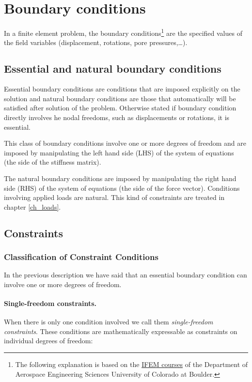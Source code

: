 \section{Boundary conditions}
In a finite element problem, the boundary conditions\footnote{The following explanation is based on the \href{http://www.colorado.edu/engineering/CAS/courses.d/IFEM.d/}{IFEM courses} of the Department of Aerospace Engineering Sciences
University of Colorado at Boulder.} are the specified values of the field variables (displacement, rotations, pore pressures,\ldots).

\subsection{Essential and natural boundary conditions}
Essential boundary conditions are conditions that are imposed explicitly on the solution and natural boundary conditions are those that automatically will be satisfied after solution of the problem. Otherwise stated if boundary condition directly involves he nodal freedoms, such as displacements or rotations, it is essential.

This class of boundary conditions involve one or more degrees of freedom and are imposed by manipulating the left hand side (LHS) of the system of equations (the side of the stiffness matrix).

The natural boundary conditions are imposed by manipulating the right hand side (RHS) of the system of equations (the side of the force vector). Conditions involving applied loads are natural. This kind of constraints are treated in chapter \ref{ch_loads}.

\subsection{Constraints}

\subsubsection{Classification of Constraint Conditions}
In the previous  description we have said that an essential boundary condition can involve one or more degrees of freedom.

\paragraph{Single-freedom constraints.}
When there is only one condition involved we call them \emph{single-freedom constraints}. These conditions are mathematically expressable as constraints on individual degrees of freedom:

